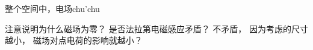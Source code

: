 
\begin{issues}
\issueDraft
\end{issues}

整个空间中，电场chu'chu

注意说明为什么磁场为零？ 是否法拉第电磁感应矛盾？ 不矛盾， 因为考虑的尺寸越小， 磁场对点电荷的影响就越小？
